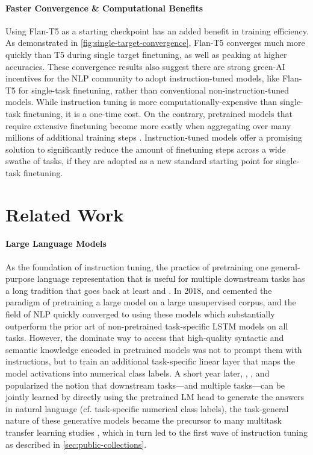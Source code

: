 \paragraph{Faster Convergence \& Computational Benefits} Using Flan-T5 as a starting checkpoint has an added benefit in training efficiency. As demonstrated in \ref{fig:single-target-convergence}, Flan-T5 converges much more quickly than T5 during single target finetuning, as well as peaking at higher accuracies. These convergence results also suggest there are strong green-AI incentives for the NLP community to adopt instruction-tuned models, like Flan-T5 for single-task finetuning, rather than conventional non-instruction-tuned models. While instruction tuning is more computationally-expensive than single-task finetuning, it is a one-time cost. On the contrary, pretrained models that require extensive finetuning become more costly when aggregating over many millions of additional training steps \citep{wu2022sustainable, bommasani2021opportunities}. Instruction-tuned models offer a promising solution to significantly reduce the amount of finetuning steps across a wide swathe of tasks, if they are adopted as a new standard starting point for single-task finetuning.

\section{Related Work}
\label{sec:rw}

\paragraph{Large Language Models} 

As the foundation of instruction tuning, the practice of pretraining one general-purpose language representation that is useful for multiple downstream tasks has a long tradition that goes back at least \citet{word2vec} and \citet{pretrainedLSTM}. 
In 2018, \citet{peters-etal-2018-deep} and \citet{devlin-etal-2019-bert} cemented the paradigm of pretraining a large model on a large unsupervised corpus, and the field of NLP quickly converged to using these models which substantially outperform the prior art of non-pretrained task-specific LSTM models on all tasks. However, the dominate way to access that high-quality syntactic and semantic knowledge encoded in pretrained models was not to prompt them with instructions, but to train an additional task-specific linear layer that maps the model activations into numerical class labels. A short year later, \citet{radford2019language}, \citet{raffel2020exploring}, and \citet{lewis-etal-2020-bart} popularized the notion that downstream tasks—and multiple tasks—can be jointly learned by directly using the pretrained LM head to generate the answers in natural language (cf. task-specific numerical class labels), the task-general nature of these generative models became the precursor to many multitask transfer learning studies \citep{mccann2018natural,khashabi-etal-2020-unifiedqa,ye2021crossfit,vu-etal-2020-exploring}, which in turn led to the first wave of instruction tuning as described in \ref{sec:public-collections}.


